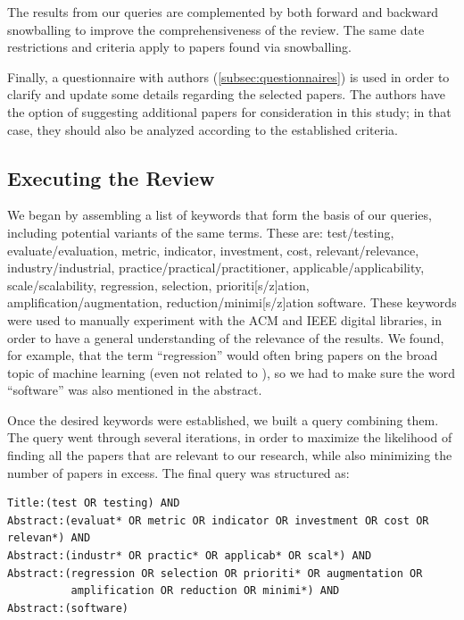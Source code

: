The results from our queries are complemented by both forward and backward snowballing to improve the comprehensiveness of the review. 
The same date restrictions and criteria apply to papers found via snowballing.

Finally, a questionnaire with authors (\autoref{subsec:questionnaires}) is used in order to clarify and update some details regarding the selected papers.
The authors have the option of suggesting additional papers for consideration in this study; in that case, they should also be analyzed according to the established criteria.

\subsection{Executing the Review}
We began by assembling a list of keywords that form the basis of our queries, including potential variants of the same terms. 
These are: test/testing, evaluate/evaluation, metric, indicator, investment, cost, relevant/relevance, industry/industrial, practice/practical/practitioner, applicable/applicability, scale/scalability, regression, selection, prioriti[s/z]ation, amplification/augmentation, reduction/minimi[s/z]ation software.
These keywords were used to manually experiment with the ACM and IEEE digital libraries, in order to have a general understanding of the relevance of the results. 
We found, for example, that the term ``regression'' would often bring papers on the broad topic of machine learning (even not related to \rt), so we had to make sure the word ``software'' was also mentioned in the abstract.

Once the desired keywords were established, we built a query combining them.
The query went through several iterations, in order to maximize the likelihood of finding all the papers that are relevant to our research, while also minimizing the number of papers in excess.
The final query was structured as:

\small
\begin{verbatim}
Title:(test OR testing) AND 
Abstract:(evaluat* OR metric OR indicator OR investment OR cost OR relevan*) AND
Abstract:(industr* OR practic* OR applicab* OR scal*) AND
Abstract:(regression OR selection OR prioriti* OR augmentation OR 
          amplification OR reduction OR minimi*) AND
Abstract:(software)
\end{verbatim}

\normalsize


\label{subsec:execution}

